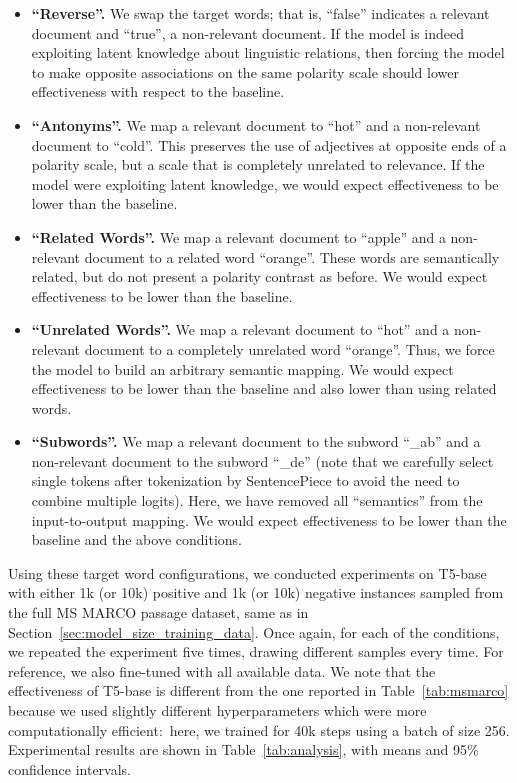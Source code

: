 \documentclass{article}
\begin{document}
\begin{itemize}[leftmargin=*]

\item {\bf ``Reverse''.} We swap the target words; that is, ``false'' indicates a relevant document and ``true'', a non-relevant document.
If the model is indeed exploiting latent knowledge about linguistic relations, then forcing the model to make opposite associations on the same polarity scale should lower effectiveness with respect to the baseline.

\item {\bf ``Antonyms''.} We map a relevant document to ``hot'' and a non-relevant document to ``cold''.
This preserves the use of adjectives at opposite ends of a polarity scale, but a scale that is completely unrelated to relevance.
If the model were exploiting latent knowledge, we would expect effectiveness to be lower than the baseline.

\item {\bf ``Related Words''.} We map a relevant document to ``apple'' and a non-relevant document to a related word ``orange''.
These words are semantically related, but do not present a polarity contrast as before.
We would expect effectiveness to be lower than the baseline.

\item {\bf ``Unrelated Words''.} We map a relevant document to ``hot'' and a non-relevant document to a completely unrelated word ``orange''.
Thus, we force the model to build an arbitrary semantic mapping.
We would expect effectiveness to be lower than the baseline and also lower than using related words.

\item {\bf ``Subwords''.} We map a relevant document to the subword ``\_ab'' and a non-relevant document to the subword ``\_de'' (note that we carefully select single tokens after tokenization by SentencePiece to avoid the need to combine multiple logits).
Here, we have removed all ``semantics'' from the input-to-output mapping.
We would expect effectiveness to be lower than the baseline and the above conditions.

\end{itemize}

Using these target word configurations, we conducted experiments on T5-base with either 1k (or 10k) positive and 1k (or 10k) negative instances sampled from the full MS MARCO passage dataset, same as in Section~\ref{sec:model_size_training_data}.
Once again, for each of the conditions, we repeated the experiment five times, drawing different samples every time.
For reference, we also fine-tuned with all available data.
We note that the effectiveness of T5-base is different from the one reported in Table~\ref{tab:msmarco} because we used slightly different hyperparameters which were more computationally efficient:\ here, we trained for 40k steps using a batch of size 256.
Experimental results are shown in Table~\ref{tab:analysis}, with means and 95\% confidence intervals.
\end{document}
